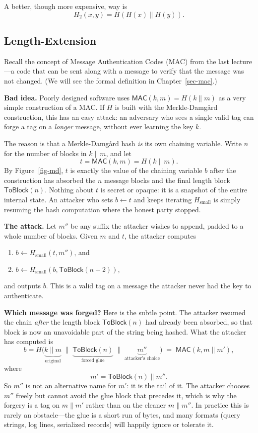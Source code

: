 \documentclass[
  letterpaper,
]{scrbook}
\providecommand{\tightlist}{%
  \setlength{\itemsep}{0pt}\setlength{\parskip}{0pt}}
\newcommand{\MAC}{\mathsf{MAC}}
\theoremstyle{definition}
\theoremstyle{plain}
\theoremstyle{plain}
\theoremstyle{remark}
\begin{document}
A better, though more expensive, way is
\[ H_2(x, y) = H(H(x) \| H(y)). \]

\subsection{Length-Extension}\label{length-extension}

Recall the concept of Message Authentication Codes (MAC) from the last
lecture---a code that can be sent along with a message to verify that
the message was not changed. (We will see the formal definition in
Chapter~\ref{sec-mac}.)

\textbf{Bad idea.} Poorly designed software uses
\(\MAC(k, m) = H(k \| m)\) as a very simple construction of a MAC. If
\(H\) is built with the Merkle-Damgård construction, this has an easy
attack: an adversary who sees a single valid tag can forge a tag on a
\emph{longer} message, without ever learning the key \(k\).

The reason is that a Merkle-Damgård hash \emph{is} its own chaining
variable. Write \(n\) for the number of blocks in \(k \| m\), and let
\[ t = \MAC(k, m) = H(k \| m). \] By Figure~\ref{fig-md}, \(t\) is
exactly the value of the chaining variable \(b\) after the construction
has absorbed the \(n\) message blocks and the final length block
\(\mathsf{ToBlock}(n)\). Nothing about \(t\) is secret or opaque: it is
a snapshot of the entire internal state. An attacker who sets
\(b \gets t\) and keeps iterating \(H_\text{small}\) is simply resuming
the hash computation where the honest party stopped.

\textbf{The attack.} Let \(m''\) be any suffix the attacker wishes to
append, padded to a whole number of blocks. Given \(m\) and \(t\), the
attacker computes

\begin{enumerate}
\def\labelenumi{\arabic{enumi}.}
\tightlist
\item
  \(b \gets H_\text{small}(t, m'')\), and
\item
  \(b \gets H_\text{small}(b, \mathsf{ToBlock}(n+2))\),
\end{enumerate}

and outputs \(b\). This is a valid tag on a message the attacker never
had the key to authenticate.

\textbf{Which message was forged?} Here is the subtle point. The
attacker resumed the chain \emph{after} the length block
\(\mathsf{ToBlock}(n)\) had already been absorbed, so that block is now
an unavoidable part of the string being hashed. What the attacker has
computed is \[
b = H\big(\underbrace{k \| m}_{\text{original}} \;\|\;
    \underbrace{\mathsf{ToBlock}(n)}_{\text{forced glue}} \;\|\;
    \underbrace{m''}_{\text{attacker's choice}}\big)
  \;=\; \MAC(k, m \| m'),
\] where \[ m' = \mathsf{ToBlock}(n) \| m''. \] So \(m''\) is not an
alternative name for \(m'\): it is the tail of it. The attacker chooses
\(m''\) freely but cannot avoid the glue block that precedes it, which
is why the forgery is a tag on \(m \| m'\) rather than on the cleaner
\(m \| m''\). In practice this is rarely an obstacle---the glue is a
short run of bytes, and many formats (query strings, log lines,
serialized records) will happily ignore or tolerate it.
\end{document}
